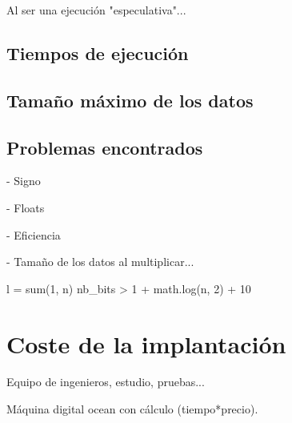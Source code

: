 Al ser una ejecución "especulativa"...

\subsection{Tiempos de ejecución}

\subsection{Tamaño máximo de los datos}




\subsection{Problemas encontrados}

- Signo

- Floats

- Eficiencia


- Tamaño de los datos al multiplicar...

l = sum(1, n)
nb_bits > 1 + math.log(n, 2) + 10

\section{Coste de la implantación}

Equipo de ingenieros, estudio, pruebas...

Máquina digital ocean con cálculo (tiempo*precio).
